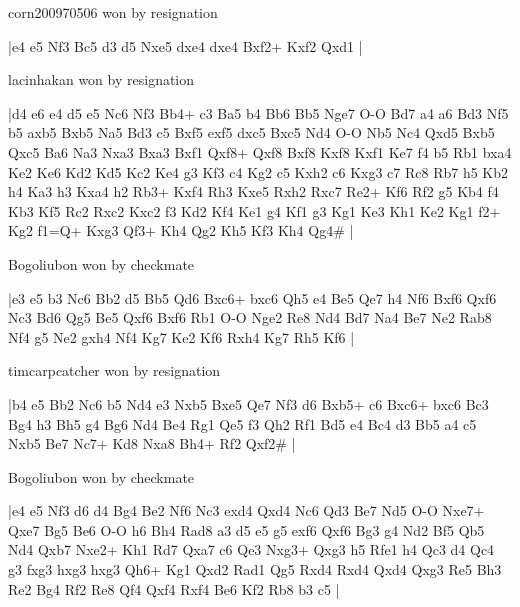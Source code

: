 \showboard

corn200970506 won by resignation

\makegametitle
|e4 e5 Nf3 Bc5 d3 d5 Nxe5 dxe4 dxe4 Bxf2+ Kxf2 Qxd1  |

\showboard

lacinhakan won by resignation

\makegametitle
|d4 e6 e4 d5 e5 Nc6 Nf3 Bb4+ c3 Ba5 b4 Bb6 Bb5 Nge7 O-O Bd7 a4 a6 Bd3 Nf5 b5 axb5 Bxb5 Na5 Bd3 c5 Bxf5 exf5 dxc5 Bxc5 Nd4 O-O Nb5 Nc4 Qxd5 Bxb5 Qxc5 Ba6 Na3 Nxa3 Bxa3 Bxf1 Qxf8+ Qxf8 Bxf8 Kxf8 Kxf1 Ke7 f4 b5 Rb1 bxa4 Ke2 Ke6 Kd2 Kd5 Kc2 Ke4 g3 Kf3 c4 Kg2 c5 Kxh2 c6 Kxg3 c7 Rc8 Rb7 h5 Kb2 h4 Ka3 h3 Kxa4 h2 Rb3+ Kxf4 Rh3 Kxe5 Rxh2 Rxc7 Re2+ Kf6 Rf2 g5 Kb4 f4 Kb3 Kf5 Rc2 Rxc2 Kxc2 f3 Kd2 Kf4 Ke1 g4 Kf1 g3 Kg1 Ke3 Kh1 Ke2 Kg1 f2+ Kg2 f1=Q+ Kxg3 Qf3+ Kh4 Qg2 Kh5 Kf3 Kh4 Qg4\#  |

\showboard

Bogoliubon won by checkmate

\makegametitle
|e3 e5 b3 Nc6 Bb2 d5 Bb5 Qd6 Bxc6+ bxc6 Qh5 e4 Be5 Qe7 h4 Nf6 Bxf6 Qxf6 Nc3 Bd6 Qg5 Be5 Qxf6 Bxf6 Rb1 O-O Nge2 Re8 Nd4 Bd7 Na4 Be7 Ne2 Rab8 Nf4 g5 Ne2 gxh4 Nf4 Kg7 Ke2 Kf6 Rxh4 Kg7 Rh5 Kf6  |

\showboard

timcarpcatcher won by resignation

\makegametitle
|b4 e5 Bb2 Nc6 b5 Nd4 e3 Nxb5 Bxe5 Qe7 Nf3 d6 Bxb5+ c6 Bxc6+ bxc6 Bc3 Bg4 h3 Bh5 g4 Bg6 Nd4 Be4 Rg1 Qe5 f3 Qh2 Rf1 Bd5 e4 Bc4 d3 Bb5 a4 c5 Nxb5 Be7 Nc7+ Kd8 Nxa8 Bh4+ Rf2 Qxf2\#  |

\showboard

Bogoliubon won by checkmate

\makegametitle
|e4 e5 Nf3 d6 d4 Bg4 Be2 Nf6 Nc3 exd4 Qxd4 Nc6 Qd3 Be7 Nd5 O-O Nxe7+ Qxe7 Bg5 Be6 O-O h6 Bh4 Rad8 a3 d5 e5 g5 exf6 Qxf6 Bg3 g4 Nd2 Bf5 Qb5 Nd4 Qxb7 Nxe2+ Kh1 Rd7 Qxa7 c6 Qe3 Nxg3+ Qxg3 h5 Rfe1 h4 Qc3 d4 Qc4 g3 fxg3 hxg3 hxg3 Qh6+ Kg1 Qxd2 Rad1 Qg5 Rxd4 Rxd4 Qxd4 Qxg3 Re5 Bh3 Re2 Bg4 Rf2 Re8 Qf4 Qxf4 Rxf4 Be6 Kf2 Rb8 b3 c5  |

\showboard

